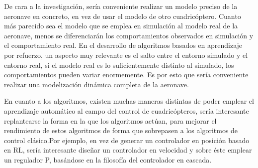 De cara a la investigación, sería conveniente realizar un modelo preciso de la aeronave en concreto, en vez de usar el modelo de otro cuadricóptero. Cuanto más parecido sea el modelo que se emplea en simulación al modelo real de la aeronave, menos se diferenciarán los comportamientos observados en simulación y el comportamiento real. En el desarrollo de algoritmos basados en aprendizaje por refuerzo, un aspecto muy relevante es el salto entre el entorno simulado y el entorno real, si el modelo real es lo suficientemente distinto al simulado, los comportamientos pueden variar enormemente. Es por esto que sería conveniente realizar una modelización dinámica completa de la aeronave.

En cuanto a los algoritmos, existen muchas maneras distintas de poder emplear el aprendizaje automático al campo del control de cuadricópteros, sería interesante replantearse la forma en la que los algoritmos actúan, para mejorar el rendimiento de estos algoritmos de forma que sobrepasen a los algoritmos de control clásico.Por ejemplo, en vez de generar un controlador en posición basado en RL, sería interesante diseñar un controlador en velocidad y sobre éste emplear un regulador P, basándose en la filosofía del controlador en cascada.  







	